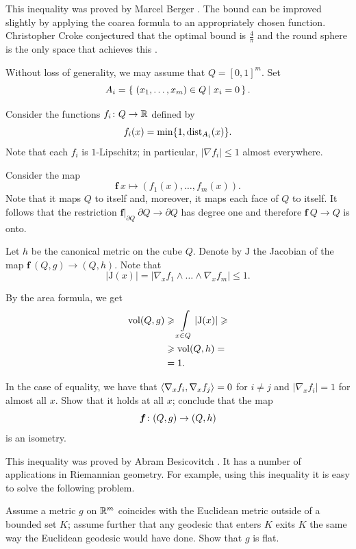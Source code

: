 This inequality was proved by Marcel Berger \cite{berger}. 
The bound can be improved slightly by applying the coarea formula to an appropriately chosen function.
Christopher Croke conjectured that the optimal bound is $\tfrac4\pi$ and the round sphere is the only space that achieves this \cite[Conjecture 0.3 in][]{croke}.


Without loss of generality, we may assume that $Q=[0,1]^m$.
Set 
\[A_i=\set{(x_1,\ldots,x_m)\in Q}{x_i=0}.\]

Consider the functions $f_i\colon Q\to\mathbb{R}$ defined by
$$f_i(x)=\min \{1,\operatorname{\rm dist}\nolimits_{A_i}(x)\}.$$
Note that each $f_i$ is $1$-Lipschitz; 
in particular, $|\nabla f_i|\le 1$ almost everywhere.

Consider the map
\[\bm{f}\:x\mapsto(f_1(x),\ldots,f_m(x)).\]
Note that it maps $Q$ to itself
and, moreover, it maps each face of $Q$ to itself.
It follows that the restriction $\bm{f}|_{\partial Q}\:\partial Q\to \partial Q$ has degree one and therefore 
$\bm{f}\:Q\to Q$ is onto.

Let $h$ be the canonical metric on the cube $Q$.
Denote by $\mathrm{J}$ the Jacobian of the map $\bm{f}\:(Q,g)\to (Q,h)$.
Note that 
\[|\mathrm{J}(x)|=|\nabla_x f_1\wedge\ldots\wedge\nabla_xf_m|\le 1.\]

By the area formula, we get 
\begin{align*}
\operatorname{\rm vol}\nolimits(Q,g)
&\geqslant \int\limits_{x\in Q}|\mathrm{J}(x)|\geqslant
\\
&\geqslant\operatorname{\rm vol}\nolimits(Q,h)=\\
&=1.
\end{align*}

In the case of equality, we have that $\langle\nabla_x f_i,\nabla_x f_j\rangle=0$ for $i\ne j$ 
and $|\nabla_x f_i|=1$ for almost all $x$.
Show that it holds at all $x$; conclude that the map
\[\bm{f}\:(Q,g)\z\to (Q,h)\] 
is an isometry.
\qeds

This inequality was proved by Abram Besicovitch \cite{besicovitch}.
It has a number of applications in Riemannian geometry.
For example, using this inequality it is easy to solve the following problem.

\begin{pr}
Assume a metric $g$ on $\mathbb{R}^m$ coincides with the Euclidean metric outside of a bounded set $K$;
assume further that any geodesic that enters $K$ exits $K$ the same way the Euclidean geodesic would have done. 
Show that $g$ is flat.
\end{pr}

